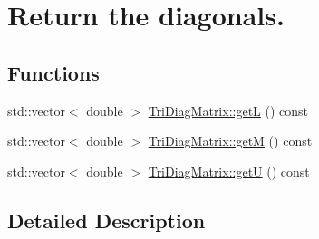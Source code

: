 \hypertarget{group__getdiagonals}{\section{Return the diagonals.}
\label{group__getdiagonals}
}
\subsection*{Functions}
\begin{DoxyCompactItemize}
\item 
std\-::vector$<$ double $>$ \hyperlink{group__getdiagonals_ga1fc79c48a0e508670d9cb446bdb89ac0}{Tri\-Diag\-Matrix\-::get\-L} () const 
\item 
std\-::vector$<$ double $>$ \hyperlink{group__getdiagonals_gaef21cbb3555650842cc666112732110e}{Tri\-Diag\-Matrix\-::get\-M} () const 
\item 
std\-::vector$<$ double $>$ \hyperlink{group__getdiagonals_ga23e779914d8691b0b9012c4f45e036ca}{Tri\-Diag\-Matrix\-::get\-U} () const 
\end{DoxyCompactItemize}


\subsection{Detailed Description}


